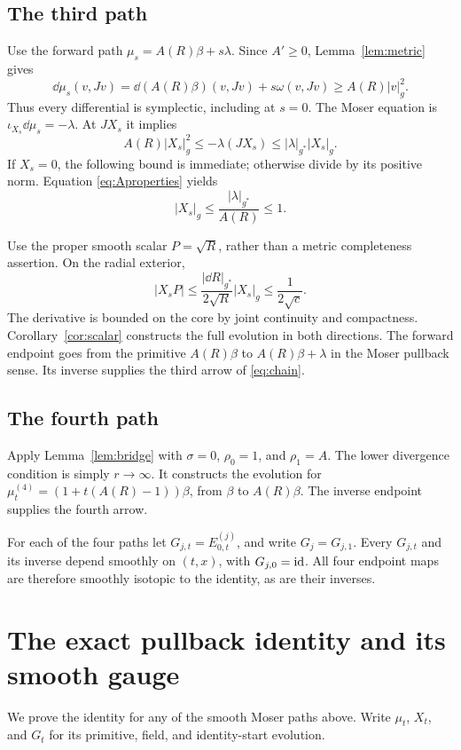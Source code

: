 \subsection{The third path}
Use the forward path $\mu_s=A(R)\beta+s\lambda$.
Since $A'\ge0$, Lemma~\ref{lem:metric} gives
\[
 \dd\mu_s(v,Jv)
 =\dd(A(R)\beta)(v,Jv)+s\omega(v,Jv)
 \ge A(R)|v|_g^2 .
\]
Thus every differential is symplectic, including at $s=0$.
The Moser equation is $\iota_{X_s}\dd\mu_s=-\lambda$.
At $JX_s$ it implies
\[
 A(R)|X_s|_g^2
 \le-\lambda(JX_s)
 \le|\lambda|_{g^*}|X_s|_g .
\]
If $X_s=0$, the following bound is immediate; otherwise divide by
its positive norm. Equation \eqref{eq:Aproperties} yields
\begin{equation}\label{eq:thirdbound}
 |X_s|_g\le\frac{|\lambda|_{g^*}}{A(R)}\le1 .
\end{equation}

Use the proper smooth scalar $P=\sqrt R$, rather than a
metric completeness assertion. On the radial exterior,
\[
 |X_sP|
 \le\frac{|\dd R|_{g^*}}{2\sqrt R}|X_s|_g
 \le\frac1{2\sqrt c}.
\]
The derivative is bounded on the core by joint continuity and
compactness. Corollary~\ref{cor:scalar} constructs the full
evolution in both directions.
The forward endpoint goes from the primitive $A(R)\beta$
to $A(R)\beta+\lambda$ in the Moser pullback sense.
Its inverse supplies the third arrow of \eqref{eq:chain}.

\subsection{The fourth path}
Apply Lemma~\ref{lem:bridge} with
$\sigma=0$, $\rho_0=1$, and $\rho_1=A$.
The lower divergence condition is simply $r\to\infty$.
It constructs the evolution for
$\mu^{(4)}_t=(1+t(A(R)-1))\beta$, from $\beta$ to $A(R)\beta$.
The inverse endpoint supplies the fourth arrow.

For each of the four paths let $G_{j,t}=E^{(j)}_{0,t}$,
and write $G_j=G_{j,1}$. Every $G_{j,t}$ and its inverse depend
smoothly on $(t,x)$, with $G_{j,0}=\mathrm{id}$. All four endpoint maps
are therefore smoothly isotopic to the identity, as are their
inverses.

\section{The exact pullback identity and its smooth gauge}
We prove the identity for any of the smooth Moser paths above.
Write $\mu_t$, $X_t$, and $G_t$ for its primitive, field, and
identity-start evolution.

